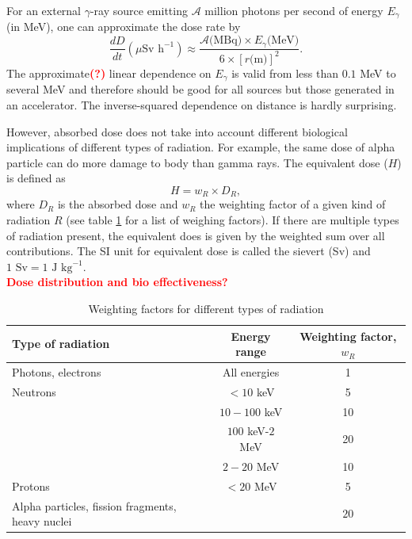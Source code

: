 \documentclass[preprint,aip,pra]{revtex4-1}
\newcommand{\red}[1]{\textcolor{red}{\bf #1}}
\begin{document}
        For an external $\gamma$-ray source emitting $\mathcal{A}$ million photons per second 
        of energy $E_{\gamma}$
        (in MeV), one can approximate the dose rate by 
        \begin{equation}
            \frac{dD}{dt}(\mu\text{Sv h}^{-1}) \approx \frac{\mathcal{A}\text{(MBq)}\times E_{\gamma}\text{(MeV)}}
            {6\times [r\text{(m)}]^2}.
        \end{equation}
        The approximate\red{(?)} linear dependence on $E_{\gamma}$ is valid from less than $0.1$ MeV to several
        MeV and therefore should be good for all sources but those generated in an accelerator.\cite{my68}
        The inverse-squared dependence on distance is hardly surprising.

        However, absorbed dose does not take into account different biological implications of different types
        of radiation.
        For example, the same dose of alpha particle can do more damage to body than gamma rays. The equivalent
        dose ($H$) is defined as
        \begin{equation}
        H=w_R \times D_R,
        \end{equation}
        where $D_R$ is the absorbed dose and $w_R$ the weighting factor of a given kind of radiation $R$
        (see table \ref{tab:eq} for a list of weighing factors). If there are multiple types of radiation 
        present, the equivalent does is given by the weighted sum over all contributions. The SI unit for
        equivalent dose is called the sievert (Sv) and $1\text{ Sv}=1\text{ J kg}^{-1}$.
        \\\red{Dose distribution and bio effectiveness?}
        \begin{table}
            \label{tab:eq}
            \centering
            \caption{Weighting factors for different types of radiation\cite{icrp74}}
            \begin{ruledtabular}
                \begin{tabular}{l c c}
                Type of radiation & Energy range & Weighting factor, $w_R$\\
                \hline
                Photons, electrons & All energies & 1\\
                Neutrons & $<10$ keV & 5 \\
                         & $10-100$ keV & 10 \\
                         & $100$ keV-$2$ MeV & 20 \\
                         & $2-20$ MeV & 10 \\
                Protons & $<20$ MeV & 5 \\
                Alpha particles, fission fragments, heavy nuclei & & $20$\\
            \end{tabular}
            \end{ruledtabular}
        \end{table}
\end{document}
